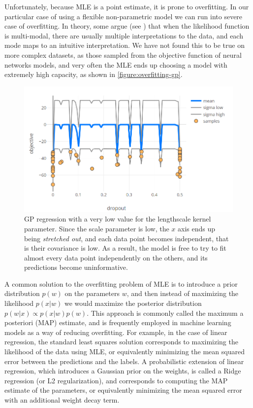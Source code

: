 Unfortunately, because MLE is a point estimate, it is prone to overfitting. In
our particular case of using a flexible non-parametric model we can run into
severe case of overfitting. In theory, some argue (see
\citep{williams2006gaussian}) that when the likelihood function is multi-modal,
there are usually multiple interpretations to the data, and each mode maps to
an intuitive interpretation. We have not found this to be true on more complex
datasets, as those sampled from the objective function of neural networks
models, and very often the MLE ends up choosing a model with extremely high
capacity, as shown in \autoref{figure:overfitting-gp}.

\begin{figure}
	\begin{center}
		\includegraphics[width=1.0\textwidth]{images/overfitting-gp.png}
		\caption{GP regression with a very low value for the lengthscale kernel parameter. Since the scale parameter is low, the $x$ axis ends up being \emph{stretched out}, and each data point becomes independent, that is their covariance is low. As a result, the model is free to try to fit almost every data point independently on the others, and its predictions become uninformative.}
		\label{figure:overfitting-gp}
	\end{center}
\end{figure}

A common solution to the overfitting problem of MLE is to introduce a prior
distribution $p(w)$ on the parameters $w$, and then instead of maximizing the
likelihood $p(x|w)$ we would maximize the posterior distribution $p(w | x)
\propto p(x | w) p(w)$. This approach is commonly called the maximum a
posteriori (MAP) estimate, and is frequently employed in machine learning
models as a way of reducing overfitting. For example, in the case of linear
regression, the standard least squares solution corresponds to maximizing the
likelihood of the data using MLE, or equivalently minimizing the mean squared
error between the predictions and the labels. A probabilistic extension of
linear regression, which introduces a Gaussian prior on the weights, is called
a Ridge regression (or L2 regularization), and corresponds to computing the MAP
estimate of the parameters, or equivalently minimizing the mean squared error
with an additional weight decay term.

